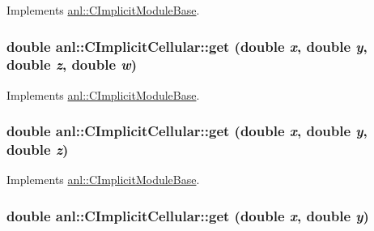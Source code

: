 Implements \hyperlink{classanl_1_1CImplicitModuleBase_aa40b7d54572197612a4fea44b63447eb}{anl::CImplicitModuleBase}.\hypertarget{classanl_1_1CImplicitCellular_aaa7f9b16d76ba2fd6e8c1105ea76ba1e}{
\subsubsection[{get}]{\setlength{\rightskip}{0pt plus 5cm}double anl::CImplicitCellular::get (double {\em x}, \/  double {\em y}, \/  double {\em z}, \/  double {\em w})}}
\label{classanl_1_1CImplicitCellular_aaa7f9b16d76ba2fd6e8c1105ea76ba1e}


Implements \hyperlink{classanl_1_1CImplicitModuleBase_a3cf520bdab59631864253c03b4e1723f}{anl::CImplicitModuleBase}.\hypertarget{classanl_1_1CImplicitCellular_aefaad448623f73921542503bc6ef898a}{
\subsubsection[{get}]{\setlength{\rightskip}{0pt plus 5cm}double anl::CImplicitCellular::get (double {\em x}, \/  double {\em y}, \/  double {\em z})}}
\label{classanl_1_1CImplicitCellular_aefaad448623f73921542503bc6ef898a}


Implements \hyperlink{classanl_1_1CImplicitModuleBase_ac17d592612c82ba3d47f9229a00b1fe3}{anl::CImplicitModuleBase}.\hypertarget{classanl_1_1CImplicitCellular_aefb6e04efeb573a51112f1f27edef569}{
\subsubsection[{get}]{\setlength{\rightskip}{0pt plus 5cm}double anl::CImplicitCellular::get (double {\em x}, \/  double {\em y})}}
\label{classanl_1_1CImplicitCellular_aefb6e04efeb573a51112f1f27edef569}


